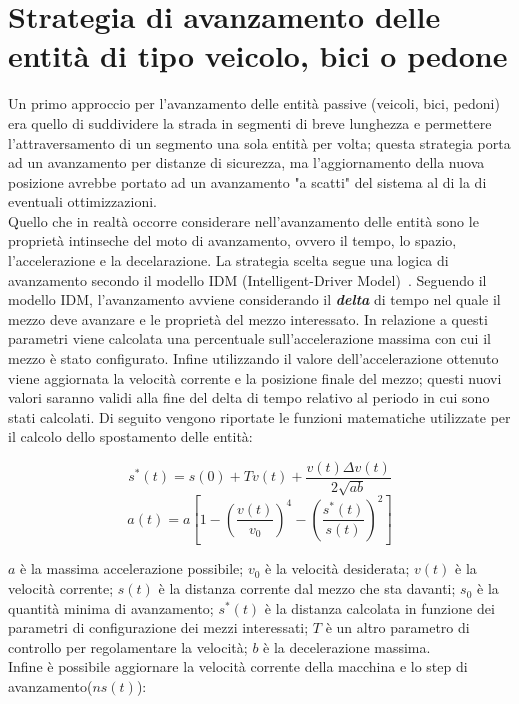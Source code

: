 \section{Strategia di avanzamento delle entità di tipo veicolo, bici o pedone}
Un primo approccio per l'avanzamento delle entità passive (veicoli, bici, pedoni) era quello di suddividere la strada in segmenti di breve lunghezza e permettere l'attraversamento di un segmento una sola entità per volta; questa strategia porta ad un avanzamento per distanze di sicurezza, ma l'aggiornamento della nuova posizione avrebbe portato ad un avanzamento "a scatti" del sistema al di la di eventuali ottimizzazioni. \\
Quello che in realtà occorre considerare nell'avanzamento delle entità sono le
proprietà intinseche del moto di avanzamento, ovvero il tempo, lo spazio,
l'accelerazione  e la decelarazione. La strategia scelta segue una logica di
avanzamento secondo il modello IDM (Intelligent-Driver
Model)~\cite{treiber2000microscopic}.
Seguendo il modello IDM, l'avanzamento avviene considerando il \textbf{\textit{delta}} di tempo nel quale il mezzo deve avanzare e le proprietà del mezzo interessato. In relazione a questi parametri viene calcolata una percentuale sull'accelerazione massima con cui il mezzo è stato configurato. Infine utilizzando il valore dell'accelerazione ottenuto viene aggiornata la velocità corrente e la posizione finale del mezzo; questi nuovi valori saranno validi alla fine del delta di tempo relativo al periodo in cui sono stati calcolati. Di seguito vengono riportate le funzioni matematiche utilizzate per il calcolo dello spostamento delle entità:

\begin{equation}
s^{*}(t)=s(0)+Tv(t)+\frac{v(t)\Delta{v(t)}}{2\sqrt{ab}}
\end{equation}
\begin{equation}
a(t)=a[1-(\frac{v(t)}{v_{0}})^4-(\frac{s^{*}(t)}{s(t)})^2]
\end{equation}

$a$ è la massima accelerazione possibile; $v_{0}$ è la velocità desiderata; $v(t)$ è la velocità corrente; $s(t)$ è la distanza corrente dal mezzo che sta davanti; $s_{0}$ è la quantità minima di avanzamento; $s^*(t)$ è la distanza calcolata in funzione dei parametri di configurazione dei mezzi interessati; $T$ è un altro parametro di controllo per regolamentare la velocità; $b$ è la decelerazione massima.\\
Infine è possibile aggiornare la velocità corrente della macchina e lo step di avanzamento($ns(t)$): \\

